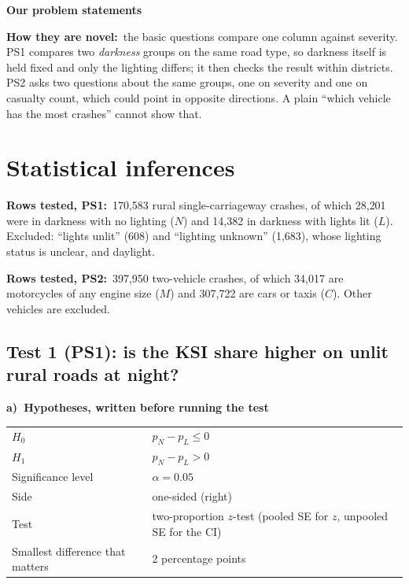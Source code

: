 \documentclass[10pt,a4paper,twocolumn]{article}
\newcommand{\field}[2]{\textbf{#1}~#2\par}
\newcommand{\tpart}[2]{\par\Needspace{12\baselineskip}\smallskip\textbf{#1)~#2}\par}
\newcommand{\minihead}[1]{\par\Needspace{8\baselineskip}\smallskip\textbf{#1}\par}
\begin{document}
\newpage
\minihead{Our problem statements}

\noindent{}

\field{How they are novel:}{the basic questions compare one column against severity. PS1
compares two \emph{darkness} groups on the same road type, so darkness itself is held fixed and
only the lighting differs; it then checks the result within districts. PS2 asks two questions
about the same groups, one on severity and one on casualty count, which could point in opposite
directions. A plain ``which vehicle has the most crashes'' cannot show that.}

\section{Statistical inferences}

\field{Rows tested, PS1:}{170{,}583 rural single-carriageway crashes, of which 28{,}201 were in
darkness with no lighting ($N$) and 14{,}382 in darkness with lights lit ($L$). Excluded:
``lights unlit'' (608) and ``lighting unknown'' (1{,}683), whose lighting status is unclear,
and daylight.}

\field{Rows tested, PS2:}{397{,}950 two-vehicle crashes, of which 34{,}017 are motorcycles of
any engine size ($M$) and 307{,}722 are cars or taxis ($C$). Other vehicles are excluded.}

\subsection*{Test 1 (PS1): is the KSI share higher on unlit rural roads at night?}

\tpart{a}{Hypotheses, written before running the test}
{\small
\begin{tabularx}{\linewidth}{@{}K{3.4cm} Y@{}}
\toprule
$H_0$ & $p_N-p_L\le0$ \\
$H_1$ & $p_N-p_L>0$ \\
Significance level & $\alpha=0.05$ \\
Side & one-sided (right) \\
Test & two-proportion $z$-test (pooled SE for $z$, unpooled SE for the CI) \\
Smallest difference that matters & 2 percentage points \\
\bottomrule
\end{tabularx}}
\end{document}
